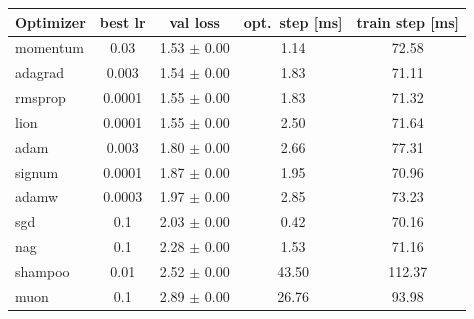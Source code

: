 \begin{tabular}{lcccc}
\toprule
Optimizer & best lr & val loss & opt.\ step [ms] & train step [ms] \\
\midrule
momentum & 0.03 & 1.53 $\pm$ 0.00 & 1.14 & 72.58 \\
adagrad & 0.003 & 1.54 $\pm$ 0.00 & 1.83 & 71.11 \\
rmsprop & 0.0001 & 1.55 $\pm$ 0.00 & 1.83 & 71.32 \\
lion & 0.0001 & 1.55 $\pm$ 0.00 & 2.50 & 71.64 \\
adam & 0.003 & 1.80 $\pm$ 0.00 & 2.66 & 77.31 \\
signum & 0.0001 & 1.87 $\pm$ 0.00 & 1.95 & 70.96 \\
adamw & 0.0003 & 1.97 $\pm$ 0.00 & 2.85 & 73.23 \\
sgd & 0.1 & 2.03 $\pm$ 0.00 & 0.42 & 70.16 \\
nag & 0.1 & 2.28 $\pm$ 0.00 & 1.53 & 71.16 \\
shampoo & 0.01 & 2.52 $\pm$ 0.00 & 43.50 & 112.37 \\
muon & 0.1 & 2.89 $\pm$ 0.00 & 26.76 & 93.98 \\
\bottomrule
\end{tabular}
